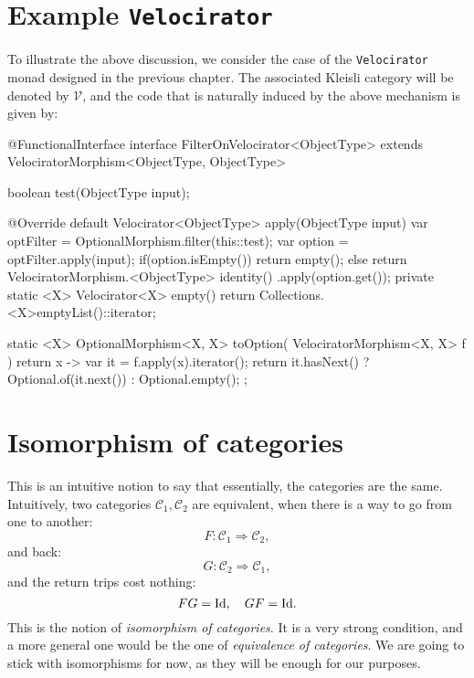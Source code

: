 \documentclass[12pt,a4paper]{report}
\renewcommand{\baselinestretch}{1.5}
\theoremstyle{theorem}
\theoremstyle{definition}
\begin{document}
\section{Example \lstinline{Velocirator}{}}

To illustrate the above discussion, we consider the case of the
\lstinline{Velocirator}{} monad designed in the previous chapter.
The associated Kleisli category will be denoted by $\mathscr{V}$,
and the code that is naturally induced by the above mechanism
is given by:

\renewcommand{\baselinestretch}{1} 
\selectfont

\begin{javacode}
@FunctionalInterface
interface FilterOnVelocirator<ObjectType>
extends VelociratorMorphism<ObjectType, ObjectType>
{
  boolean test(ObjectType input);

  @Override
  default Velocirator<ObjectType> apply(ObjectType input) {
    var optFilter = OptionalMorphism.filter(this::test);
    var option = optFilter.apply(input);
    if(option.isEmpty()) {
      return empty();
    } else {
      return VelociratorMorphism.<ObjectType> identity()
               .apply(option.get());
    }
  }
  private static <X> Velocirator<X> empty()
    { return Collections.<X>emptyList()::iterator; }

  static <X> OptionalMorphism<X, X> toOption(
    VelociratorMorphism<X, X> f
  ) {
    return x -> {
      var it = f.apply(x).iterator();
      return it.hasNext()
             ? Optional.of(it.next())
             : Optional.empty();
    };
  }
}
\end{javacode}

\renewcommand{\baselinestretch}{1.5} 
\selectfont

\section{Isomorphism of categories}

This is an intuitive notion to say that essentially, the categories are
the same. Intuitively, two categories $\mathcal{C}_1,\mathcal{C}_2$
are equivalent, when there is a way to go from one to another:
	\[ F : \mathcal{C}_1\Rightarrow \mathcal{C}_2, \]
and back:
	\[ G : \mathcal{C}_2\Rightarrow \mathcal{C}_1 ,\]
and the return trips cost nothing:
	\[ FG = {\rm Id} ,\quad GF = {\rm Id} .\]
This is the notion of \emph{isomorphism of categories}.
It is a very strong condition, and a more general one would be the one
of \emph{equivalence of categories}. We are going to stick with
isomorphisms for now, as they will be enough for our purposes.
\end{document}
